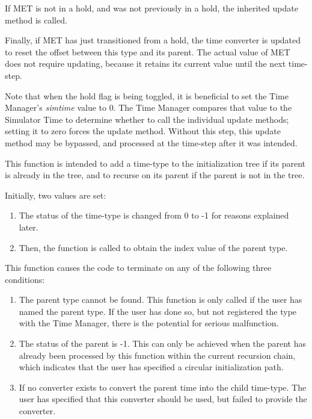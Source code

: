 {\begin{enumerate}
\begin{enumerate}
If MET is not in a hold, and was not previously in a hold, the inherited
update method is called.

Finally, if MET has just transitioned from a hold, the time converter is
updated to reset the offset between this type and its parent.  The actual
value of MET does not require updating, because it retains its current value
until the next time-step.

Note that when the hold flag is being toggled, it is beneficial to set the
Time Manager's \textit{simtime} value to 0. The Time Manager compares that
value to the Simulator Time to determine whether to call the individual
update methods; setting it to zero forces the update method.  Without this
step, this update method may be bypassed, and processed at the time-step after
it was intended.
\end{enumerate}

\label{ref:TimeStandard}


{\begin{enumerate}
This function is intended to add a time-type to the initialization tree
if its parent is already in the tree, and to recurse on its parent if
the parent is not in the tree.

Initially, two values are set:


\begin{enumerate}
\item The status of the time-type is changed from 0 to -1 for reasons
explained later.
\item Then, the  function is
called to
obtain the index value of the parent type.
\end{enumerate}



This function causes the code to terminate on any of the following three
conditions:


\begin{enumerate}
\item The parent type cannot be found.  This function is only called if
the user has named the parent type.  If the user has done so, but not
registered the type with the Time Manager, there is the potential for
serious malfunction.
\item The status of the parent is -1.  This can only be achieved when
the parent has already been processed by this function within the
current recursion chain, which indicates that the user has specified a
circular initialization path.
\item If no converter exists to convert the parent time into the child
time-type.  The user has specified that this converter should be used,
but failed to provide the converter.
\end{enumerate}


\end{enumerate}}
\end{enumerate}}
